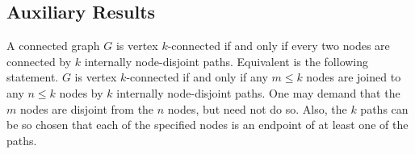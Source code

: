 \begin{definition}[TU matrix]
  \label{def:tu_matrix}
\end{definition}

\subsection{Auxiliary Results}

\begin{theorem}
  \label{thm:Menger}
  A connected graph $G$ is vertex $k$-connected if and only if every two nodes are connected by $k$ internally node-disjoint paths.
  Equivalent is the following statement. $G$ is vertex $k$-connected if and only if any $m \leq k$ nodes are joined to any $n \leq k$ nodes by $k$ internally node-disjoint paths.
  One may demand that the $m$ nodes are disjoint from the $n$ nodes, but need not do so.
  Also, the $k$ paths can be so chosen that each of the specified nodes is an endpoint of at least one of the paths.
\end{theorem}

\begin{definition}
  \label{def:Delta_Y_exchange}
\end{definition}

\begin{theorem}
  \label{census sec 3.3}
\end{theorem}
